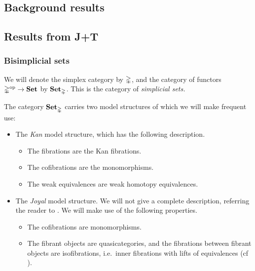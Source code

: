 \documentclass[main.tex]{subfiles}
\begin{document}
\begin{appendix}
  \section{Background results}
  \label{sec:background}

  \subsection{Results from J+T}
  \label{ssc:results_from_j_t}

  \subsubsection{Bisimplicial sets}
  \label{sss:bisimplicial_sets}

  We will denote the simplex category by $\mathbb{\Delta}$, and the category of functors $\mathbb{\Delta}^{\mathrm{op}} \to \mathbf{Set}$ by $\mathbf{Set}_{\mathbb{\Delta}}$. This is the category of \emph{simplicial sets.}

  The category $\mathbf{Set}_{\mathbb{\Delta}}$ carries two model structures of which we will make frequent use:
  \begin{itemize}
    \item The \emph{Kan} model structure, which has the following description.
      \begin{itemize}
        \item The fibrations are the Kan fibrations.

        \item The cofibrations are the monomorphisms.

        \item The weak equivalences are weak homotopy equivalences.
      \end{itemize}

    \item The \emph{Joyal} model structure. We will not give a complete description, referring the reader to \cite[Sec.\ 2.2.5]{highertopostheory}. We will make use of the following properties.
      \begin{itemize}
        \item The cofibrations are monomorphisms.

        \item The fibrant objects are quasicategories, and the fibrations between fibrant objects are isofibrations, i.e.\ inner fibrations with lifts of equivalences (cf \cite[Cor.\ 2.6.5]{highertopostheory}).
      \end{itemize}
  \end{itemize}


\end{appendix}
\end{document}
